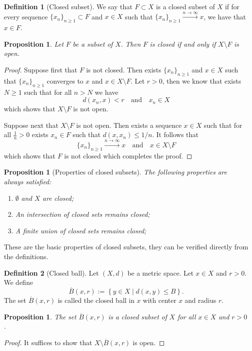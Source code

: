 \documentclass[11pt,a4paper]{article}
\theoremstyle{definition}
\newtheorem{definition}{Definition}[section]
\theoremstyle{plain}
\newtheorem{proposition}[theorem]{Proposition}
\newcommand{\tand}{\quad \text{and} \quad}
\newcommand{\set}[2]{ \left\{ #1 \mid #2 \right\} }
\begin{document}
  \begin{definition}[Closed subset]
    We say that $F \subset X$ is a closed subset of $X$ if for every
    sequence $\{x_n\}_{n \geq 1} \subset F$ and $x \in X$ such that
    $\{x_n\}_{n \geq 1} \xrightarrow{n \to \infty} x$, we have that
    $x \in F$.
  \end{definition}
  \begin{proposition}
    Let $F$ be a subset of $X$. Then $F$ is closed if and only if 
    $X \setminus F$ is open.
  \end{proposition}
  \begin{proof}
    Suppose first that $F$ is not closed. Then exists $\{x_n\}_{n \geq 1}$
    and $x \in X$ such that $\{x_n\}_{n \geq 1}$ converges to $x$
    and $x \in X \setminus F$. Let $r > 0$, then we know that exists
    $N \geq 1$ such that for all $n > N$ we have
    \[
      d(x_n,x) < r \tand x_n \in X
    \]
    which shows that $X \setminus F$ is not open.

    Suppose next that $X \setminus F$ is not open. Then exists a sequence
    $x \in X$ such that for all $\frac{1}{n} > 0$ exists
    $x_n \in F$ such that $d(x,x_n) \le 1/n$. It follows that
    \[
      \{x_n\}_{n \geq 1} \xrightarrow{n \to \infty} x \tand
      x \in X \setminus F
    \]
    which shows that $F$ is not closed which completes the proof.
  \end{proof}

  \begin{proposition}[Properties of closed subsets]
    The following properties are always satisfied:
    \begin{enumerate}
      \item[(1)] $\emptyset$ and $X$ are closed;
      \item[(2)] An intersection of closed sets remains closed;
      \item[(3)] A finite union of closed sets remains closed;
    \end{enumerate}
  \end{proposition}
  These are the basic properties of closed subsets, they can be verified
  directly from the definitions.

  \begin{definition}[Closed ball]
    Let $(X,d)$ be a metric space. Let $x \in X$ and $r > 0$.
    We define
    \[
      \overline{B}(x,r) := \set{y \in X}{d(x,y) \le B}. 
    \]
    The set $\overline{B}(x,r)$ is called the closed ball in $x$ with center
    $x$ and radius $r$.
  \end{definition}
  \begin{proposition}
    The set $\overline{B}(x,r)$ is a closed subset of $X$ for all $x \in X$
    and $r > 0$.
  \end{proposition}
  \begin{proof}
    It suffices to show that $X \setminus \overline B(x,r)$ is open.
  \end{proof}
  
\end{document}
